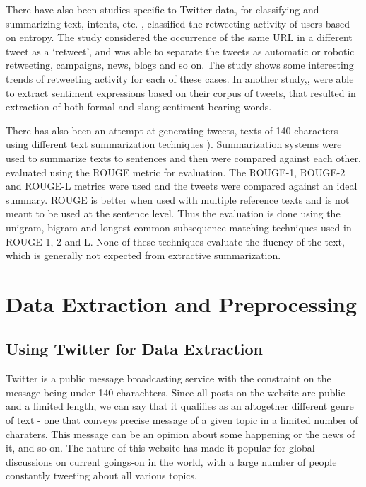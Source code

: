 \documentclass[11pt]{article}
\begin{document}
There have also been studies specific to Twitter data, for classifying and summarizing text, intents, etc. \cite{ghosh2011entropy}, classified the retweeting activity of users based on entropy. The study considered the occurrence of the same URL in a different tweet as a ‘retweet’, and was able to separate the tweets as automatic or robotic retweeting, campaigns, news, blogs and so on. The study shows some interesting trends of retweeting activity for each of these cases. In another study,\cite{chen2012extracting}, were able to extract sentiment expressions based on their corpus of tweets, that resulted in extraction of both formal and slang sentiment bearing words.

There has also been an attempt at generating tweets, texts of 140 characters using different text summarization techniques \cite{lloret2013towards}). Summarization systems were used to summarize texts to sentences and then were compared against each other, evaluated using the ROUGE metric for evaluation. The ROUGE-1, ROUGE-2 and ROUGE-L metrics were used and the tweets were compared against an ideal summary. ROUGE is better when used with multiple reference texts and is not meant to be used at the sentence level. Thus the evaluation is done using the unigram, bigram and longest common subsequence matching techniques used in ROUGE-1, 2 and L. None of these techniques evaluate the fluency of the text, which is generally not expected from extractive summarization. 

\section{Data Extraction and Preprocessing}

\subsection{Using Twitter for Data Extraction}

Twitter is a public message broadcasting service with the constraint on the message being under 140 charachters. Since all posts on the website are public and a limited length, we can say that it qualifies as an altogether different genre of text - one that conveys precise message of a given topic in a limited number of charaters. This message can be an opinion about some happening or the news of it, and so on. The nature of this website has made it popular for global discussions on current goings-on in the world, with a large number of people constantly tweeting about all various topics.
\end{document}
